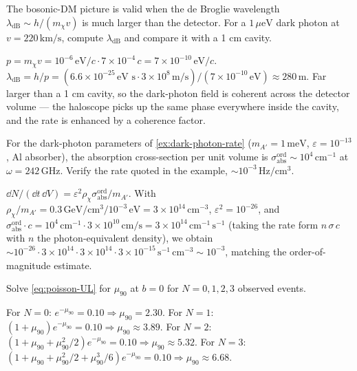 \begin{exercise}
The bosonic-DM picture is valid when the de Broglie wavelength
$\lambda_\text{dB}\sim h/(m_\chi v)$ is much larger than the
detector. For a $1\,\mu\text{eV}$ dark photon at $v=220\,\text{km}/\text{s}$,
compute $\lambda_\text{dB}$ and compare it with a 1 cm cavity.
\begin{solution}
$p=m_\chi v=10^{-6}\,\text{eV}/c\cdot 7\times 10^{-4}\,c=7\times 10^{-10}\,\text{eV}/c$.
$\lambda_\text{dB}=h/p=(6.6\times 10^{-25}\,\text{eV s}\cdot
3\times 10^8\,\text{m/s})/(7\times 10^{-10}\,\text{eV})\approx 280\,\text{m}$.
Far larger than a 1 cm cavity, so the dark-photon field is coherent
across the detector volume --- the haloscope picks up the same
phase everywhere inside the cavity, and the rate is enhanced by a
coherence factor.
\end{solution}
\end{exercise}

\begin{exercise}
For the dark-photon parameters of \cref{ex:dark-photon-rate}
($m_{A'}=1\,\text{meV}$, $\varepsilon=10^{-13}$, Al absorber), the
absorption cross-section per unit volume is
$\sigma_\text{abs}^\text{ord}\sim 10^4\,\text{cm}^{-1}$ at
$\omega=242\,\text{GHz}$. Verify the rate quoted in the example,
$\sim 10^{-3}\,\text{Hz}/\text{cm}^3$.
\begin{solution}
$\dd N/(\dd t\,\dd V)=\varepsilon^2\rho_\chi\sigma_\text{abs}^\text{ord}/m_{A'}$.
With $\rho_\chi/m_{A'}=0.3\,\text{GeV}/\text{cm}^3 / 10^{-3}\,\text{eV}
=3\times 10^{14}\,\text{cm}^{-3}$, $\varepsilon^2=10^{-26}$, and
$\sigma_\text{abs}^\text{ord}\cdot c=10^4\,\text{cm}^{-1}\cdot 3\times 10^{10}\,\text{cm/s}
=3\times 10^{14}\,\text{cm}^{-1}\,\text{s}^{-1}$ (taking the rate
form $n\,\sigma\,c$ with $n$ the photon-equivalent density), we
obtain $\sim 10^{-26}\cdot 3\times 10^{14}\cdot 3\times 10^{14}\cdot
3\times 10^{-15}\,\text{s}^{-1}\,\text{cm}^{-3}\sim 10^{-3}$,
matching the order-of-magnitude estimate.
\end{solution}
\end{exercise}

\begin{exercise}
Solve \cref{eq:poisson-UL} for $\mu_{90}$ at $b=0$ for $N=0,1,2,3$
observed events.
\begin{solution}
For $N=0$: $e^{-\mu_{90}}=0.10\Rightarrow\mu_{90}=2.30$.
For $N=1$: $(1+\mu_{90})e^{-\mu_{90}}=0.10\Rightarrow\mu_{90}\approx 3.89$.
For $N=2$: $(1+\mu_{90}+\mu_{90}^2/2)e^{-\mu_{90}}=0.10\Rightarrow\mu_{90}\approx 5.32$.
For $N=3$: $(1+\mu_{90}+\mu_{90}^2/2+\mu_{90}^3/6)e^{-\mu_{90}}=0.10
\Rightarrow\mu_{90}\approx 6.68$.
\end{solution}
\end{exercise}

